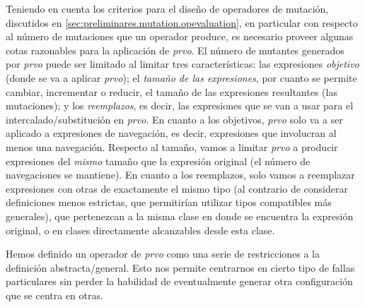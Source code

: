 
Teniendo en cuenta los criterios para el dise\~no de operadores de mutaci\'on, discutidos en \ref{sec:preliminares.mutation.opevaluation}, en particular con respecto al n\'umero de mutaciones que un operador produce, es necesario proveer algunas cotas razonables para la aplicaci\'on de \emph{prvo}. El n\'umero de mutantes generados por \emph{prvo} puede ser limitado al limitar tres caracter\'isticas: las expresiones \emph{objetivo} (donde se va a aplicar \emph{prvo}); el \emph{tama\~no de las expresiones}, por cuanto se permite cambiar, incrementar o reducir, el tama\~no de las expresiones resultantes (las mutaciones); y los \emph{reemplazos}, es decir, las expresiones que se van a usar para el intercalado/substituci\'on en \emph{prvo}. En cuanto a los objetivos, \emph{prvo} solo va a ser aplicado a expresiones de navegaci\'on, es decir, expresiones que involucran al menos una navegaci\'on. Respecto al tama\~no, vamos a limitar \emph{prvo} a producir expresiones del \emph{mismo} tama\~no que la expresi\'on original (el n\'umero de navegaciones se mantiene). En cuanto a los reemplazos, solo vamos a reemplazar expresiones con otras de exactamente el mismo tipo (al contrario de considerar definiciones menos estrictas, que permitir\'ian utilizar tipos compatibles m\'as generales), que pertenezcan a la misma clase en donde se encuentra la expresi\'on original, o en clases directamente alcanzables desde esta clase.

Hemos definido un operador de \emph{prvo} como una serie de restricciones a la definici\'on abstracta/general. Esto nos permite centrarnos en cierto tipo de fallas particulares sin perder la habilidad de eventualmente generar otra configuraci\'on que se centra en otras.

